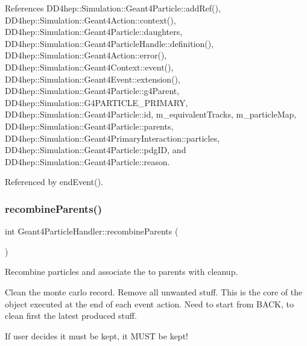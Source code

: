 References D\+D4hep\+::\+Simulation\+::\+Geant4\+Particle\+::add\+Ref(), D\+D4hep\+::\+Simulation\+::\+Geant4\+Action\+::context(), D\+D4hep\+::\+Simulation\+::\+Geant4\+Particle\+::daughters, D\+D4hep\+::\+Simulation\+::\+Geant4\+Particle\+Handle\+::definition(), D\+D4hep\+::\+Simulation\+::\+Geant4\+Action\+::error(), D\+D4hep\+::\+Simulation\+::\+Geant4\+Context\+::event(), D\+D4hep\+::\+Simulation\+::\+Geant4\+Event\+::extension(), D\+D4hep\+::\+Simulation\+::\+Geant4\+Particle\+::g4\+Parent, D\+D4hep\+::\+Simulation\+::\+G4\+P\+A\+R\+T\+I\+C\+L\+E\+\_\+\+P\+R\+I\+M\+A\+RY, D\+D4hep\+::\+Simulation\+::\+Geant4\+Particle\+::id, m\+\_\+equivalent\+Tracks, m\+\_\+particle\+Map, D\+D4hep\+::\+Simulation\+::\+Geant4\+Particle\+::parents, D\+D4hep\+::\+Simulation\+::\+Geant4\+Primary\+Interaction\+::particles, D\+D4hep\+::\+Simulation\+::\+Geant4\+Particle\+::pdg\+ID, and D\+D4hep\+::\+Simulation\+::\+Geant4\+Particle\+::reason.



Referenced by end\+Event().

\hypertarget{class_d_d4hep_1_1_simulation_1_1_geant4_particle_handler_a828738c3b9ec35cff6ea6fc659b6df4a}{}\label{class_d_d4hep_1_1_simulation_1_1_geant4_particle_handler_a828738c3b9ec35cff6ea6fc659b6df4a} 
\subsubsection{\texorpdfstring{recombine\+Parents()}{recombineParents()}}
{\footnotesize\ttfamily int Geant4\+Particle\+Handler\+::recombine\+Parents (\begin{DoxyParamCaption}{ }\end{DoxyParamCaption})\hspace{0.3cm}{\ttfamily [protected]}}



Recombine particles and associate the to parents with cleanup. 

Clean the monte carlo record. Remove all unwanted stuff. This is the core of the object executed at the end of each event action. Need to start from B\+A\+CK, to clean first the latest produced stuff.

If user decides it must be kept, it M\+U\+ST be kept!

